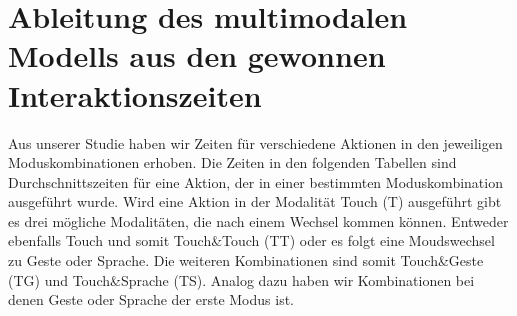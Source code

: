 \section[Herleitung des Modells]{Ableitung des multimodalen Modells aus den gewonnen Interaktionszeiten}\label{sec:Herleitung}
Aus unserer Studie haben wir Zeiten für verschiedene Aktionen in den jeweiligen Moduskombinationen erhoben.
Die Zeiten in den folgenden Tabellen sind Durchschnittszeiten für eine Aktion, der in einer bestimmten Moduskombination ausgeführt wurde.
Wird eine Aktion in der Modalität Touch (T) ausgeführt gibt es drei mögliche Modalitäten, die nach einem Wechsel kommen können.
Entweder ebenfalls Touch und somit Touch\&Touch (TT) oder es folgt eine Moudswechsel zu Geste oder Sprache.
Die weiteren Kombinationen sind somit Touch\&Geste (TG) und Touch\&Sprache (TS).
Analog dazu haben wir Kombinationen bei denen Geste oder Sprache der erste Modus ist.

